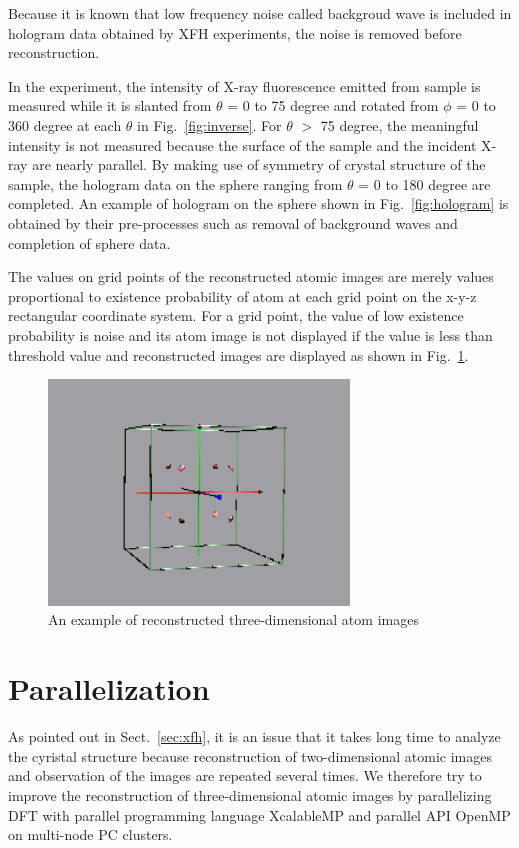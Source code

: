 \documentclass[graybox,vecphys]{svmult}
\begin{document}
Because it is known that low frequency noise called backgroud wave is
included in hologram data obtained by XFH experiments, the noise is
removed before reconstruction.

In the experiment, the intensity of X-ray fluorescence emitted from
sample is measured while it is slanted from $\theta$ = 0 to 75 degree
and rotated from $\phi$ = 0 to 360 degree at each $\theta$ in
Fig.~\ref{fig:inverse}.  For $\theta$ $>$ 75 degree, the meaningful
intensity is not measured because the surface of the sample and the
incident X-ray are nearly parallel. By making use of symmetry of
crystal structure of the sample, the hologram data on the sphere
ranging from $\theta$ = 0 to 180 degree are completed.  An example of
hologram on the sphere shown in Fig.~\ref{fig:hologram} is obtained by
their pre-processes such as removal of background waves and completion
of sphere data.

The values on grid points of the reconstructed atomic images are
merely values proportional to existence probability
of atom at each grid point on the x-y-z rectangular coordinate system.
For a grid point, the value of low existence probability is noise and
its atom image is not displayed if the value is less than threshold value
and reconstructed images are displayed as shown in Fig.~\ref{fig:ccto}.

\begin{figure}[t]
  \begin{center}
    \includegraphics[width=8cm]{CCTO_Cu_9200_3d.png}
    \caption{An example of reconstructed three-dimensional atom images}
      \label{fig:ccto}
  \end{center}
\end{figure}

\section{Parallelization}\label{sec:parallelization}
As pointed out in Sect.~\ref{sec:xfh}, it is an issue 
that it takes long time to analyze the cyristal structure because
reconstruction of two-dimensional atomic images and observation
of the images are repeated several times.
We therefore try to improve the reconstruction of three-dimensional
atomic images by parallelizing DFT with parallel programming language
XcalableMP and parallel API OpenMP on multi-node PC clusters.
\end{document}
